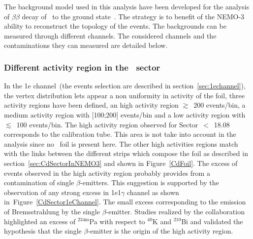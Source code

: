 \documentclass[main.tex]{subfiles}
\begin{document}
\NI The background model used in this analysis have been developed for the analysis of $\beta\beta$ decay of \Cd~to the ground state~\cite{Arnold2016bed}. The strategy is to benefit of the NEMO-3 ability to reconstruct the topology of the events. The backgrounds can be measured through different channels. The considered channels and the contaminations they can measured are detailed below.  


\bigskip


\subsubsection{Different activity region in the \Cd~sector}

\NI In the 1e channel~(the events selection are described in section~\ref{sec:1echannel}), the vertex distribution lets appear a non uniformity in activity of the foil, three activity regions have been defined, an high activity region $\gtrsim$~200 events/bin, a medium activity region with [100;200] events/bin and a low activity region with $\lesssim$~100 events/bin. The high activity region observed for Sector~$<$~18.08 corresponds to the calibration tube. This area is not take into account in the analysis since no \Cd~foil is present here. The other high activities regions match with the links between the different strips which compose the foil as described in section~\ref{sec:CdSectorInNEMO3} and shown in Figure~\ref{CdFoil}. The excess of events observed in the high activity region probably provides from a contamination of single $\beta$-emitters. This suggestion is supported by the observation of any strong excess in 1e1$\gamma$ channel as shown in~Figure~\ref{CdSector1eChannel}. The small excess corresponding to the emission of Bremsstrahlung by the single $\beta$-emitter. Studies realized by the collaboration highlighted an excess of $^{\text{234m}}$Pa with respect to $^{\text{40}}$K and $^{\text{210}}$Bi and validated the hypothesis that the single $\beta$-emitter is the origin of the high activity region.
\end{document}
